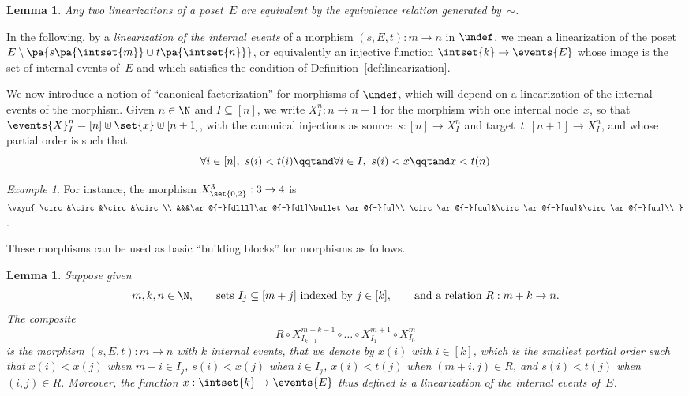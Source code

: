 \documentclass[submission,copyright,creativecommons]{eptcs}
\let\P\undef
\newtheorem{lemma}[theorem]{Lemma}
\theoremstyle{definition}
\theoremstyle{remark}
\newtheorem{example}[theorem]{Example}
\begin{document}
\begin{lemma}
  \label{lemma:lin-swap}
  Any two linearizations of a poset~$E$ are equivalent by the equivalence
  relation generated by~$\sim$.
\end{lemma}

\noindent
In the following, by a \emph{linearization of the internal events} of a morphism
$(s,E,t):m\to n$ in $\P$, we mean a linearization of the poset
$E\setminus\pa{s\pa{\intset{m}}\cup t\pa{\intset{n}}}$, or equivalently an
injective function $\intset{k}\to\events{E}$ whose image is the set of internal
events of~$E$ and which satisfies the condition of
Definition~\ref{def:linearization}.

We now introduce a notion of ``canonical factorization'' for morphisms of $\P$,
which will depend on a linearization of the internal events of the morphism.
Given $n\in\N$ and $I\subseteq[n]$, we write $X^n_I:n\to n+1$ for the morphism
with one internal node~$x$, so that
$\events{X}^n_I=[n]\uplus\set{x}\uplus[n+1]$, with the canonical injections as
source~$s:[n]\to X^n_I$ and target~$t:[n+1]\to X^n_I$, and whose partial order
is such that
\[
\forall i\in[n],\ s(i)<t(i)
\qqtand
\forall i\in I,\ s(i)<x
\qqtand
x<t(n)
\]


\begin{example}
  \label{ex:X302}
  For instance, the morphism $X^3_{\set{0,2}}:3\to 4$ is
  $
  \vxym{
    \circ&\circ&\circ&\circ\\
    &&&\ar@{-}[dlll]\ar@{-}[dl]\bullet\ar@{-}[u]\\
    \circ\ar@{-}[uu]&\circ\ar@{-}[uu]&\circ\ar@{-}[uu]\\
  }
  $.
\end{example}

\noindent
These morphisms can be used as basic ``building blocks'' for morphisms as follows.

\begin{lemma}
  \label{lemma:poset-cf-comp}
  Suppose given
  \begin{equation}
    \label{eq:fact}
    m,k,n\in\N,
    \qquad
    \text{sets $I_j\subseteq [m+j]$ indexed by $j\in[k]$},
    \qquad
    \text{and a relation $R:m+k\to n$.}
  \end{equation}
  The composite
  \begin{equation}
    \label{eq:fact-comp}
    R\circ X^{m+k-1}_{I_{k-1}}\circ\ldots\circ X^{m+1}_{I_1}\circ X^m_{I_0}
  \end{equation}
  is the morphism $(s,E,t):m\to n$ with $k$ internal events, that we denote by
  $x(i)$ with $i\in[k]$, which is the smallest partial order such that
  $x(i)<x(j)$ when $m+i\in I_j$, $s(i)<x(j)$ when $i\in I_j$, $x(i)<t(j)$ when
  $(m+i,j)\in R$, and $s(i)<t(j)$ when $(i,j)\in R$. Moreover, the function
  $x:\intset{k}\to\events{E}$ thus defined is a linearization of the internal
  events of~$E$.
\end{lemma}
\end{document}
